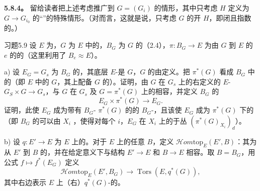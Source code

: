 \textbf{5.8.4。} 留给读者把上述考虑推广到 $G=(G_i)$ 的情形，其中只考虑 $H$ 定义为 $G\to G_{i_0}$ 的“”的特殊情形。（对而言，这就是说，只考虑 $G$ 的开 $H$，即闭且指数的。）

\begin{SGAresult}{习题}{5.9}
设 $E$ 为，$G$ 为 $E$ 中的，$B_G$ 为 $G$ 的（2.4），$\pi:B_G\to E$ 为由 $G$ 到 $E$ 的 $e$ 的的（这里利用了 $B_e\approx E$）。

 a) 设 $E_G=G_s$ 为 $B_G$ 的，其底层 $E$-是 $G$，$G$ 的由定义。把 $\pi^*(G)$ 看成 $B_G$ 中的（即 $E$ 中的 $G$，其上配备 $G$ 的）。证明，由 $G$ 在 $G_s$ 上的右定义的 $E$- $G_S\times G\to G_s$，与 $G$ 在 $G_s$ 及 $G=\pi^*(G)$ 上的相容，并定义 $B_G$ 的
\[E_G\times\pi^*(G)\longrightarrow E_G.\]
证明，此使 $E_G$ 成为带有 $B_G$- $\pi^*(G)$ 的的 $B_G$-，且该使 $E_G$ 成为 $\pi^*(G)$ 下的（即 $B_G$ 的可以由 $X_i$ ，使得对每个 $i$，$E_G$ 在 $X_i$ 上的于丛 $(\pi^*(G)_{X_i})_d$）。

 b) 设 $q:E'\to E$ 为 $E$ 上的。对于 $E$ 上的任意 $B$，定义 $\mathscr{H}om\mathrm{top}_E(E',B)$：其为从 $E'$ 到 $B$ 的，并在给定意义下与结构 $E'\to E$ 和 $B\to E$ 相容。取 $B=B_G$，用公式 $f\mapsto f^*(E_G)$ 定义
\[\mathscr{H}om\mathrm{top}_E(E',B_G)\longrightarrow\operatorname{Tors}(E,q^*(G)),\]
其中右边表示 $E$ 上（右）$q^*(G)$-的。


\end{SGAresult}
